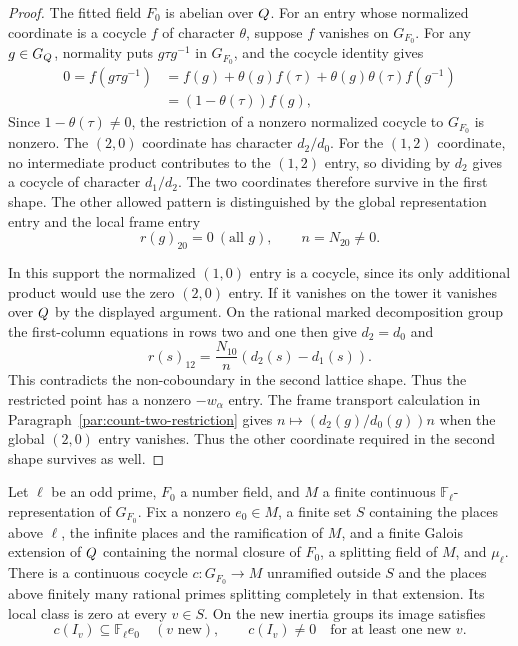 \begin{proof}
The fitted field \(F_0\) is abelian over \(Q\). For an entry
whose normalized coordinate is a cocycle \(f\) of
character \(\theta\), suppose \(f\) vanishes on \(G_{F_0}\).
For any \(g\in G_Q\), normality puts
\(g\tau g^{-1}\) in \(G_{F_0}\), and the cocycle
identity gives
\[
              \begin{aligned}
 0=f(g\tau g^{-1}) &= f(g)+\theta(g)f(\tau)
                       +\theta(g)\theta(\tau)f(g^{-1})\\
                   &=(1-\theta(\tau))f(g),
 \end{aligned}
\]
Since \(1-\theta(\tau)\ne0\), the restriction of a
nonzero normalized cocycle to \(G_{F_0}\) is nonzero.
The \((2,0)\) coordinate has character \(d_2/d_0\). For the
\((1,2)\) coordinate, no intermediate product contributes to
the \((1,2)\) entry, so dividing by \(d_2\) gives a cocycle
of character \(d_1/d_2\). The two coordinates therefore survive
in the first shape. The other allowed pattern is distinguished by the global representation entry and the local frame entry
\[
 r(g)_{20}=0\ (\text{all }g),\qquad n=N_{20}\ne0 .
\]

In this support the normalized \((1,0)\) entry is a
cocycle, since its only additional product would use
the zero \((2,0)\) entry. If it vanishes on the tower
it vanishes over \(Q\) by the displayed argument.
On the rational marked decomposition group the
first-column equations in rows two and one then
give \(d_2=d_0\) and
\[
             r(s)_{12}=\frac{N_{10}}{n}(d_2(s)-d_1(s)).
\]
This contradicts the non-coboundary in the second
lattice shape. Thus the restricted point has a
nonzero \(-w_\alpha\) entry. The frame transport calculation in
Paragraph~\ref{par:count-two-restriction} gives
\(n\mapsto (d_2(g)/d_0(g))n\) when the global \((2,0)\) entry
vanishes. Thus the other coordinate required in the second
shape survives as well.
\end{proof}

\begin{lemma}\label{lem:cup-ramification-direction}
Let \(\ell\) be an odd prime, \(F_0\) a number field, and \(M\) a
finite continuous \(\mathbb F_\ell\)-representation of \(G_{F_0}\).
Fix a nonzero \(e_0\in M\), a finite set \(S\) containing the places
above \(\ell\), the infinite places and the ramification of \(M\),
and a finite Galois extension of \(Q\) containing the normal closure
of \(F_0\), a splitting field of \(M\), and \(\mu_\ell\). There is a
continuous cocycle \(c\colon G_{F_0}\to M\) unramified outside \(S\)
and the places above finitely many rational primes splitting completely
in that extension. Its local class is zero at every \(v\in S\).
On the new inertia groups its image satisfies 
\[
 c(I_v)\subseteq\mathbb F_\ell e_0\quad(v\text{ new}),\qquad c(I_v)\ne0\quad\text{for at least one new }v.
\]

\end{lemma}

